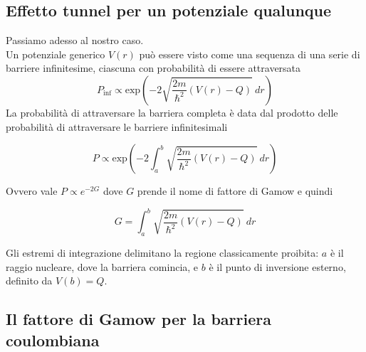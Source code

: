 \subsection*{Effetto tunnel per un potenziale qualunque}

Passiamo adesso al nostro caso. \\
Un potenziale generico $V(r)$ può essere visto come una sequenza di una serie di barriere infinitesime, ciascuna con probabilità di essere attraversata
\begin{equation}
    P_{\text{inf}} \propto \text{exp}\left( -2 \sqrt{\frac{2m}{\hbar^2} (V(r) - Q) } \ dr  \right)
\end{equation}
La probabilità di attraversare la barriera completa è data dal prodotto delle probabilità di attraversare le barriere infinitesimali
\begin{tcolorbox}[colback=black!5!white, colframe=black!45!white, boxrule=0.8pt]
\begin{equation}
    P \propto \text{exp}\left( -2 \int_{a}^{b}\sqrt{\frac{2m}{\hbar^2} (V(r) - Q) } \ dr  \right)
\end{equation}
\end{tcolorbox}

Ovvero vale $P \propto e^{-2G}$ dove $G$ prende il nome di fattore di Gamow e quindi 
\begin{tcolorbox}[colback=black!5!white, colframe=black!45!white, boxrule=0.8pt]
\begin{equation}
    G = \int_{a}^{b} \sqrt{\frac{2m}{\hbar^2} (V(r) - Q)} \ dr
\end{equation}
\end{tcolorbox}

Gli estremi di integrazione delimitano la regione classicamente proibita: $a$ è il raggio nucleare, dove la barriera comincia, e $b$ è il punto di inversione esterno, definito da $V(b) = Q$.

\subsection*{Il fattore di Gamow per la barriera coulombiana}

